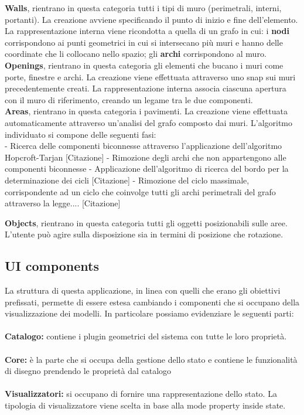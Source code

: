 \textbf{Walls}, rientrano in questa categoria tutti i tipi di muro (perimetrali, interni, portanti). La creazione avviene specificando il punto di inizio e fine dell’elemento. La rappresentazione interna viene ricondotta a quella di un grafo in cui: i \textbf{nodi} corrispondono ai punti geometrici in cui si intersecano più muri e hanno delle coordinate che li collocano nello spazio; gli \textbf{archi} corrispondono al muro.\\
\textbf{Openings}, rientrano in questa categoria gli elementi che bucano i muri come porte, finestre e archi. La creazione viene effettuata attraverso uno snap sui muri precedentemente creati. La rappresentazione interna associa ciascuna apertura con il muro di riferimento, creando un legame tra le due componenti.\\
\textbf{Areas}, rientrano in questa categoria i pavimenti. La creazione viene effettuata automaticamente attraverso un’analisi del grafo composto dai muri. L’algoritmo individuato si compone delle seguenti fasi:\\
    - Ricerca delle componenti biconnesse attraverso l'applicazione dell'algoritmo Hopcroft-Tarjan [Citazione]
    - Rimozione degli archi che non appartengono alle componenti biconnesse
    - Applicazione dell'algoritmo di ricerca del bordo per la determinazione dei cicli [Citazione]
    - Rimozione del ciclo massimale, corrispondente ad un ciclo che coinvolge tutti gli archi perimetrali del grafo attraverso la legge.... [Citazione]

\textbf{Objects}, rientrano in questa categoria tutti gli oggetti posizionabili sulle aree. L’utente può agire sulla disposizione sia in termini di posizione che rotazione.\\

\subsection{UI components}

La struttura di questa applicazione, in linea con quelli che erano gli obiettivi prefissati, permette di essere estesa cambiando i componenti che si occupano della visualizzazione dei modelli. In particolare possiamo evidenziare le seguenti parti:\\\\
\textbf{Catalogo:} contiene i plugin geometrici del sistema con tutte le loro proprietà.\\\\
\textbf{Core:} è la parte che si occupa della gestione dello stato e contiene le funzionalità di disegno prendendo le proprietà dal catalogo\\\\
\textbf{Visualizzatori:} si occupano di fornire una rappresentazione dello stato. La tipologia di visualizzatore viene scelta in base alla mode property inside state.\\\\

